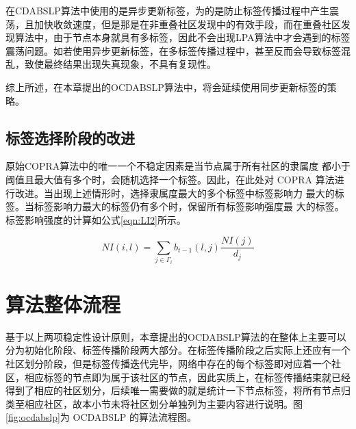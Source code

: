 在CDABSLP算法中使用的是异步更新标签，为的是防止标签传播过程中产生震荡，且加快收敛速度，但是那是在非重叠社区发现中的有效手段，而在重叠社区发现算法中，由于节点本身就具有多标签，因此不会出现LPA算法中才会遇到的标签震荡问题。如若使用异步更新标签，在多标签传播过程中，甚至反而会导致标签混乱，致使最终结果出现失真现象，不具有复现性。

综上所述，在本章提出的OCDABSLP算法中，将会延续使用同步更新标签的策略。

\subsection{标签选择阶段的改进}

原始COPRA算法中的唯一一个不稳定因素是当节点属于所有社区的隶属度
都小于阈值且最大值有多个时，会随机选择一个标签。因此，在此处对 COPRA
算法进行改进。当出现上述情形时，选择隶属度最大的多个标签中标签影响力
最大的标签。当标签影响力最大的标签仍有多个时，保留所有标签影响强度最
大的标签。标签影响强度的计算如公式\ref{eqn:LI2}所示。

\begin{equation}
  \label{eqn:LI2}
  NI(i,l)=\sum_{j \in \Gamma _i} b_{t-1}(l,j) \frac{NI(j)}{d_j}
\end{equation}

\section{算法整体流程}

基于以上两项稳定性设计原则，本章提出的OCDABSLP算法的在整体上主要可以分为初始化阶段、标签传播阶段两大部分。在标签传播阶段之后实际上还应有一个社区划分阶段，但是标签传播迭代完毕，网络中存在的每个标签即对应着一个社区，相应标签的节点即为属于该社区的节点，因此实质上，在标签传播结束就已经得到了相应的社区划分，后续唯一需要做的就是统计一下节点标签，将所有节点归类至相应社区，故本小节未将社区划分单独列为主要内容进行说明。图\ref{fig:ocdabslp}为 OCDABSLP 的算法流程图。


